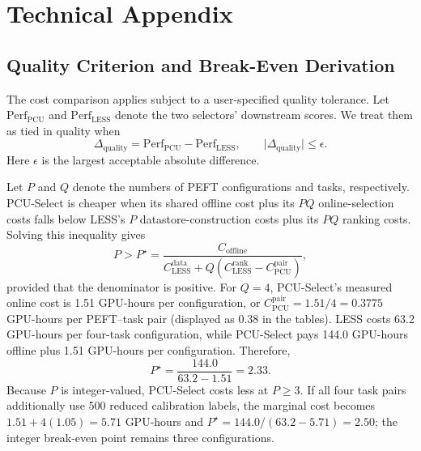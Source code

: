 \section{Technical Appendix}
\label{sec:appendix}

\subsection{Quality Criterion and Break-Even Derivation}
\label{sec:appendix-break-even}

The cost comparison applies subject to a user-specified quality tolerance.
Let $\mathrm{Perf}_{\mathrm{PCU}}$ and $\mathrm{Perf}_{\mathrm{LESS}}$ denote
the two selectors' downstream scores. We treat them as tied in quality when
\begin{equation}
  \Delta_{\mathrm{quality}}=\mathrm{Perf}_{\mathrm{PCU}}-\mathrm{Perf}_{\mathrm{LESS}},
  \qquad \lvert\Delta_{\mathrm{quality}}\rvert\le\epsilon.
  \label{eq:quality-tie}
\end{equation}
Here $\epsilon$ is the largest acceptable absolute difference.

Let $P$ and $Q$ denote the numbers of PEFT configurations and tasks,
respectively. PCU-Select is cheaper when its shared offline cost plus its $PQ$
online-selection costs falls below LESS's $P$ datastore-construction costs plus
its $PQ$ ranking costs. Solving this inequality gives
\begin{equation}
  P > P^{\star}=
  \frac{C_{\mathrm{offline}}}
  {C^{\mathrm{data}}_{\mathrm{LESS}}+
  Q(C^{\mathrm{rank}}_{\mathrm{LESS}}-C^{\mathrm{pair}}_{\mathrm{PCU}})},
  \label{eq:break-even}
\end{equation}
provided that the denominator is positive. For $Q=4$, PCU-Select's measured
online cost is 1.51 GPU-hours per configuration, or
$C^{\mathrm{pair}}_{\mathrm{PCU}}=1.51/4=0.3775$ GPU-hours per PEFT--task pair
(displayed as 0.38 in the tables). LESS costs 63.2 GPU-hours per four-task
configuration, while PCU-Select pays 144.0 GPU-hours offline plus 1.51
GPU-hours per configuration. Therefore,
\begin{equation}
  P^{\star}=\frac{144.0}{63.2-1.51}=2.33.
  \label{eq:break-even-measured}
\end{equation}
Because $P$ is integer-valued, PCU-Select costs less at $P\ge3$. If all four
task pairs additionally use 500 reduced calibration labels, the marginal cost
becomes $1.51+4(1.05)=5.71$ GPU-hours and
$P^{\star}=144.0/(63.2-5.71)=2.50$; the integer break-even point remains three
configurations.

